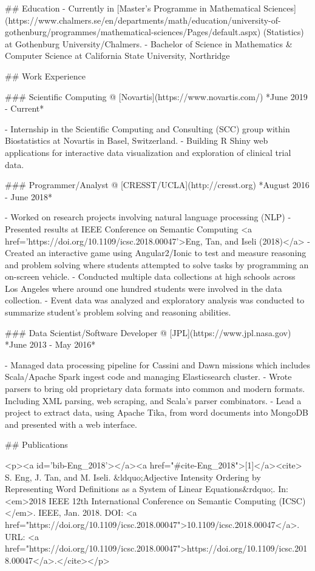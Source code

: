 

## Education
  - Currently in [Master’s Programme in Mathematical Sciences](https://www.chalmers.se/en/departments/math/education/university-of-gothenburg/programmes/mathematical-sciences/Pages/default.aspx) (Statistics) at Gothenburg University/Chalmers.
  -  Bachelor of Science in Mathematics & Computer Science at California State University, Northridge

## Work Experience

### Scientific Computing @ [Novartis](https://www.novartis.com/)
*June 2019 - Current*

  - Internship in the Scientific Computing and Consulting (SCC) group within Biostatistics at Novartis in Basel, Switzerland.
  - Building R Shiny web applications for interactive data visualization and exploration of clinical trial data.
  
### Programmer/Analyst @ [CRESST/UCLA](http://cresst.org) 
*August 2016 - June 2018*

  - Worked on research projects involving natural language processing (NLP)
    -  Presented results at IEEE Conference on Semantic Computing <a href='https://doi.org/10.1109/icsc.2018.00047'>Eng, Tan, and Iseli (2018)</a>
  - Created an interactive game using Angular2/Ionic to test and measure reasoning and problem
solving where students attempted to solve tasks by programming an on-screen vehicle.
    - Conducted multiple data collections at high schools across Los Angeles where around one hundred
students were involved in the data collection.
    - Event data was analyzed and exploratory analysis was conducted to summarize student’s problem
solving and reasoning abilities.


### Data Scientist/Software Developer @ [JPL](https://www.jpl.nasa.gov)
*June 2013 - May 2016*

  - Managed data processing pipeline for Cassini and Dawn missions which includes Scala/Apache
Spark ingest code and managing Elasticsearch cluster.
  - Wrote parsers to bring old proprietary data formats into common and modern formats. Including
XML parsing, web scraping, and Scala’s parser combinators.
  - Lead a project to extract data, using Apache Tika, from word documents into MongoDB and
presented with a web interface.
  
## Publications

<p><a id='bib-Eng_2018'></a><a href="#cite-Eng_2018">[1]</a><cite>
S. Eng, J. Tan, and M. Iseli.
&ldquo;Adjective Intensity Ordering by Representing Word Definitions as a System of Linear Equations&rdquo;.
In: 
<em>2018 IEEE 12th International Conference on Semantic Computing (ICSC)</em>.
IEEE, Jan. 2018.
DOI: <a href="https://doi.org/10.1109/icsc.2018.00047">10.1109/icsc.2018.00047</a>.
URL: <a href="https://doi.org/10.1109/icsc.2018.00047">https://doi.org/10.1109/icsc.2018.00047</a>.</cite></p>
